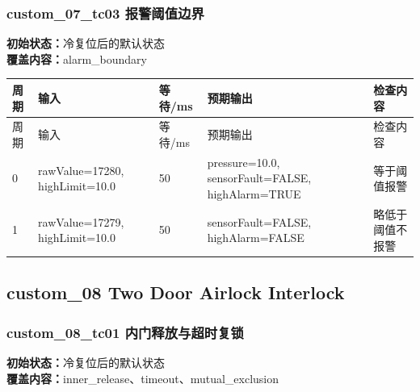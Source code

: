 \subsubsection{{\ttfamily custom\_07\_tc03} 报警阈值边界}

\noindent\textbf{初始状态：}冷复位后的默认状态\\

\textbf{覆盖内容：}alarm\_boundary

\begin{longtable}{L{1.0cm}L{4.7cm}L{1.4cm}L{4.0cm}L{2.1cm}}

\toprule

周期 & 输入 & 等待/ms & 预期输出 & 检查内容\\

\midrule

\endfirsthead

\toprule

周期 & 输入 & 等待/ms & 预期输出 & 检查内容\\

\midrule

\endhead

0 & rawValue=17280, highLimit=10.0 & 50 & pressure=10.0, sensorFault=FALSE, highAlarm=TRUE & 等于阈值报警\\

1 & rawValue=17279, highLimit=10.0 & 50 & sensorFault=FALSE, highAlarm=FALSE & 略低于阈值不报警\\

\bottomrule

\end{longtable}

\subsection{{\ttfamily custom\_08} Two Door Airlock Interlock}

\subsubsection{{\ttfamily custom\_08\_tc01} 内门释放与超时复锁}

\noindent\textbf{初始状态：}冷复位后的默认状态\\

\textbf{覆盖内容：}inner\_release、timeout、mutual\_exclusion

